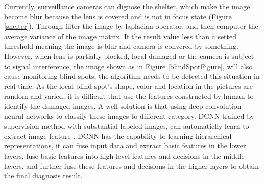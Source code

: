 \documentclass[sensors,article,submit,moreauthors,pdftex,10pt,a4paper]{mdpi}
\begin{document}
Currently, surveillance cameras can dignose the shelter, which make the image become blur because the lens is covered and is not in focus state (Figure \ref{shelter}). Through filter the image by laplacian operator, and then computer the average variance of the image matrix. If the result value less than a setted threshold meaning the image is blur and camera is convered by something. However, when lens is partially blocked, local damaged or the camera is subject to signal interference, the image shown as in Figure \ref{blindSpotFigure}, will also cause monitoring blind spots, the algorithm needs to be detected this situation in real time. As the local blind spot's shape, color and location in the pictures are random and varied, it is difficult that use the features constructed by human to identify the damaged images. A well solution is that using deep convolution neural networks to classify these images to different category. DCNN trained by supervision method with substantial labeled images, can automaticlly learn to extract image feature \cite{zeiler2014visualizing}. DCNN has the capability to learning hierarchical representations, it can fuse input data and extract basic features in the lower layers, fuse basic features into high level features and decisions in the middle layers, and further fuse these features and decisions in the higher layers to obtain the final diagnosis result.
\end{document}
